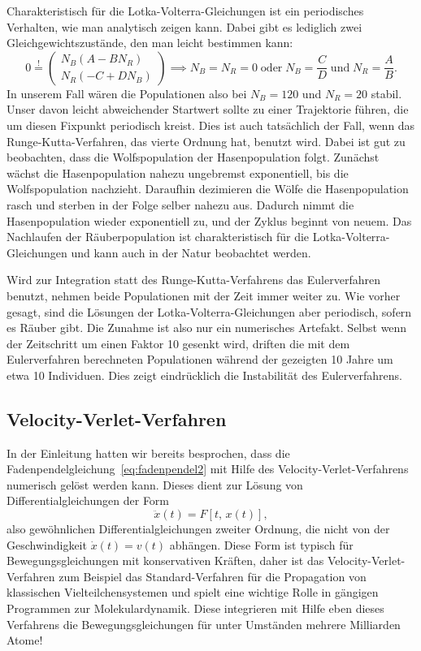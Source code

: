 Charakteristisch für die Lotka-Volterra-Gleichungen ist ein
periodisches Verhalten, wie man analytisch zeigen kann. Dabei gibt es
lediglich zwei Gleichgewichtszustände, den man leicht bestimmen kann:
\begin{equation}
  0 \stackrel{!}{=}
  \begin{pmatrix}
    N_B (A - B N_R)\\
    N_R (-C + D N_B)
  \end{pmatrix}
  \implies N_B=N_R=0\;
  \text{oder}\;N_B=\frac{C}{D}\;\text{und}\;N_R=\frac{A}{B}.
\end{equation}
In unserem Fall wären die Populationen also bei $N_B=120$ und $N_R=20$
stabil. Unser davon leicht abweichender Startwert sollte zu einer
Trajektorie führen, die um diesen Fixpunkt periodisch kreist. Dies ist
auch tatsächlich der Fall, wenn das Runge-Kutta-Verfahren, das vierte
Ordnung hat, benutzt wird. Dabei ist gut zu beobachten, dass die
Wolfspopulation der Hasenpopulation folgt. Zunächst wächst die
Hasenpopulation nahezu ungebremst exponentiell, bis die
Wolfspopulation nachzieht. Daraufhin dezimieren die Wölfe die
Hasenpopulation rasch und sterben in der Folge selber nahezu
aus. Dadurch nimmt die Hasenpopulation wieder exponentiell zu, und der
Zyklus beginnt von neuem. Das Nachlaufen der Räuberpopulation ist
charakteristisch für die Lotka-Volterra-Gleichungen und kann auch in
der Natur beobachtet werden.

Wird zur Integration statt des Runge-Kutta-Verfahrens das
Eulerverfahren benutzt, nehmen beide Populationen mit der Zeit immer
weiter zu. Wie vorher gesagt, sind die Lösungen der
Lotka-Volterra-Gleichungen aber periodisch, sofern es Räuber gibt. Die
Zunahme ist also nur ein numerisches Artefakt. Selbst wenn der
Zeitschritt um einen Faktor 10 gesenkt wird, driften die mit dem
Eulerverfahren berechneten Populationen während der gezeigten 10 Jahre
um etwa 10 Individuen. Dies zeigt eindrücklich die Instabilität des
Eulerverfahrens.

\subsection{Velocity-Verlet-Verfahren}

In der Einleitung hatten wir bereits besprochen, dass die
Fadenpendelgleichung~\eqref{eq:fadenpendel2} mit Hilfe des
Velocity-Verlet-Verfahrens numerisch gelöst werden kann. Dieses dient
zur Lösung von Differentialgleichungen der Form
\begin{equation}
  \ddot x(t) = F[t,\, x(t)],
\end{equation}
also gewöhnlichen Differentialgleichungen zweiter Ordnung, die nicht
von der Geschwindigkeit $\dot x(t) = v(t)$ abhängen. Diese Form ist
typisch für Bewegungsgleichungen mit konservativen Kräften, daher ist
das Velocity-Verlet-Verfahren zum Beispiel das Standard-Verfahren für
die Propagation von klassischen Vielteilchensystemen und spielt eine
wichtige Rolle in gängigen Programmen zur Molekulardynamik. Diese
integrieren mit Hilfe eben dieses Verfahrens die Bewegungsgleichungen
für unter Umständen mehrere Milliarden Atome!

